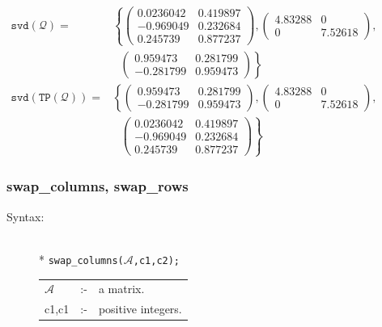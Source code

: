 {\begin{description}
  \(\begin{aligned}
     \mathtt{svd(\mathcal{Q})} = &
       \left\{
         \begin{pmatrix} 0.0236042 & 0.419897 \\ -0.969049 & 0.232684 \\ 0.245739 & 0.877237 \end{pmatrix},
         \begin{pmatrix}  4.83288 & 0 \\ 0 & 7.52618 \end{pmatrix}, \right.  \\
         & \left. \: \; \,
           \begin{pmatrix} 0.959473 & 0.281799 \\ - 0.281799 & 0.959473 \end{pmatrix}
       \right\} \\[2mm]
      \mathtt{svd(TP(\mathcal{Q}))} = &
       \left\{
         \begin{pmatrix} 0.959473 & 0.281799 \\ - 0.281799 & 0.959473 \end{pmatrix},
         \begin{pmatrix}  4.83288 & 0 \\ 0 & 7.52618 \end{pmatrix}, \right.  \\
         & \left. \: \; \,
         \begin{pmatrix} 0.0236042 & 0.419897 \\ -0.969049 & 0.232684 \\ 0.245739 & 0.877237 \end{pmatrix}
       \right\}
    \end{aligned}\)
\end{description}


\subsubsection{swap\_columns, swap\_rows}
\label{linalg:swap_columns}
\hypertarget{operator:SWAP_COLUMNS}{}

\begin{description}
\item[Syntax:]\mbox{}\\*
{\tt swap\_columns($\mathcal{A}$,c1,c2);}\\[2mm]
\begin{tabular}{l l l}
$\mathcal{A}$ &:-& a matrix. \\
c1,c1      &:-& positive integers.
\end{tabular}


\end{description}}
